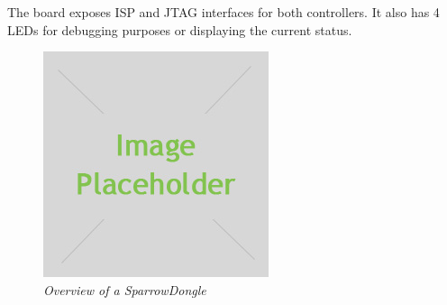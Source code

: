 The board exposes ISP and JTAG interfaces for both controllers. It also has 4
LEDs for debugging purposes or displaying the current status.

\begin{figure}[ht]
	\begin{center}
		\includegraphics[width=\textwidth]{img/placeholder.jpg}
	\end{center}
	\caption{\small \itshape{Overview of a SparrowDongle}}
\end{figure}

